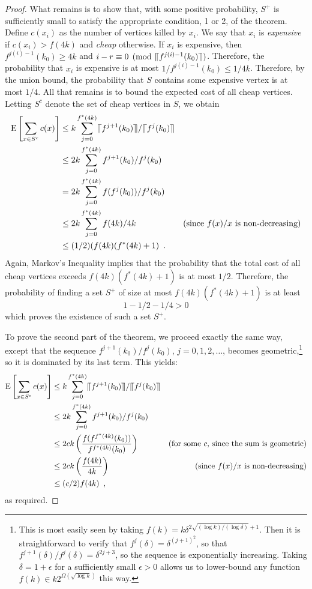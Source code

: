 \documentclass[final]{siamltex}
\newcommand{\upen}[1]{\llceil#1\rrceil}
\begin{document}
\begin{proof}
  What remains is to show that, with some positive probability, $S^+$
  is sufficiently small to satisfy the appropriate condition, 1 or 2,
  of the theorem.  Define $c(x_i)$ as the number of vertices killed by
  $x_i$.  We say that $x_i$ is \emph{expensive} if $c(x_i) > f(4k)$ and
  \emph{cheap} otherwise.  If $x_i$ is expensive, then $f^{j(i)-1}(k_0)\ge
  4k$ and $i-r\equiv 0 \pmod{\upen{f^{j(i)-1}(k_0)}}$.  Therefore,
  the probability that $x_i$ is expensive is at most $1/f^{j(i)-1}(k_0)
  \le 1/4k$.  Therefore, by the union bound, the probability that $S$
  contains some expensive vertex is at most $1/4$.  All that remains
  is to bound the expected cost of all cheap vertices. Letting $S^c$
  denote the set of cheap vertices in $S$, we obtain
  \begin{align*}
     \E\left[\sum_{x\in S^c} c(x)\right] 
      & \le  k \sum_{j=0}^{f^*(4k)} \upen{f^{j+1}(k_0)}/\upen{f^j(k_0)} \\
      & \le  2k \sum_{j=0}^{f^*(4k)} f^{j+1}(k_0)/f^j(k_0) \\
      & =  2k \sum_{j=0}^{f^*(4k)} f(f^{j}(k_0))/f^j(k_0) \\
      & \le  2k \sum_{j=0}^{f^*(4k)} f(4k)/4k 
           & \text{(since $f(x)/x$ is non-decreasing)} \\
      & \le  (1/2)(f(4k)(f^*(4k)+1) \enspace .
  \end{align*}
  Again, Markov's Inequality implies that the probability that the total
  cost of all cheap vertices exceeds $f(4k)(f^*(4k)+1)$ is at most $1/2$.
  Therefore, the probability of finding a set $S^+$ of size at most
  $f(4k)(f^*(4k)+1)$ is at least
  \[  
     1 - 1/2 - 1/4 > 0 
  \]
  which proves the existence of such a set $S^+$.
  
  To prove the second part of the theorem, we proceed exactly the same
  way, except that the sequence $f^{j+1}(k_0)/f^j(k_0)$,
  $j=0,1,2,\ldots$, becomes
  geometric,\footnote{This is most easily seen by taking $f(k)
  = k\delta^{2\sqrt{(\log k)/(\log\delta)}+1}$.  Then it is
  straightforward to verify that $f^j(\delta) = \delta^{(j+1)^2}$, so
  that $f^{j+1}(\delta)/f^j(\delta)= \delta^{2j+3}$, so the sequence
  is exponentially increasing.  Taking $\delta = 1+\epsilon$ for a
  sufficiently small $\epsilon>0$ allows us to lower-bound any function
  $f(k)\in k2^{\Omega(\sqrt{\log k})}$ this way.} so it is dominated by
  its last term.  This yields:
  \begin{align*}
  \E\left[\sum_{x\in S^c} c(x)\right] 
      & \le  k \sum_{j=0}^{f^*(4k)} \upen{f^{j+1}(k_0)}/\upen{f^j(k_0)} \\
      & \le  2k \sum_{j=0}^{f^*(4k)} f^{j+1}(k_0)/f^j(k_0) \\
      & \le  2ck\left(\frac{f(f^{f^*(4k)}(k_0))}{f^{f^*(4k)}(k_0)}\right) 
            & \text{(for some $c$, since the sum is geometric)} \\
      & \le  2ck\left(\frac{f(4k)}{4k}\right) 
            & \text{(since $f(x)/x$ is non-decreasing)} \\
      & \le  (c/2)f(4k) \enspace , & 
  \end{align*}
  as required.
\end{proof}
\end{document}
